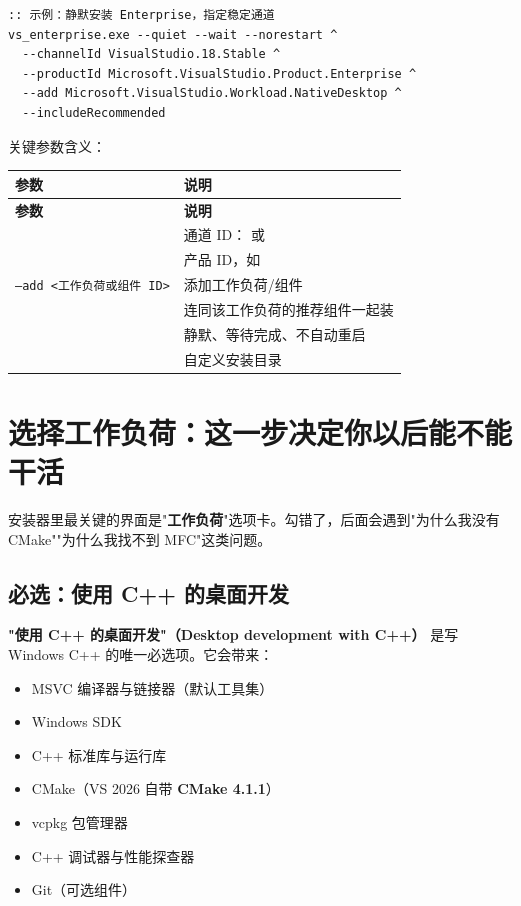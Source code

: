 \begin{lstlisting}[style=shellstyle]
:: 示例：静默安装 Enterprise，指定稳定通道
vs_enterprise.exe --quiet --wait --norestart ^
  --channelId VisualStudio.18.Stable ^
  --productId Microsoft.VisualStudio.Product.Enterprise ^
  --add Microsoft.VisualStudio.Workload.NativeDesktop ^
  --includeRecommended
\end{lstlisting}

关键参数含义：

\begin{longtable}{L{4.6cm}L{10.4cm}}
\toprule
\textbf{参数} & \textbf{说明} \\
\midrule
\endfirsthead
\toprule
\textbf{参数} & \textbf{说明} \\
\midrule
\endhead
\bottomrule
\endlastfoot
{} & 通道 ID： 或  \\
 & 产品 ID，如  \\
\texttt{--add <工作负荷或组件 ID>} & 添加工作负荷/组件 \\
 & 连同该工作负荷的推荐组件一起装 \\
 & 静默、等待完成、不自动重启 \\
 & 自定义安装目录 \\
\end{longtable}

\section{选择工作负荷：这一步决定你以后能不能干活}
安装器里最关键的界面是"\textbf{工作负荷}"选项卡。勾错了，后面会遇到"为什么我没有 CMake""为什么我找不到 MFC"这类问题。

\subsection{必选：使用 C++ 的桌面开发}
\textbf{"使用 C++ 的桌面开发"（Desktop development with C++）} 是写 Windows C++ 的唯一必选项。它会带来：

\begin{itemize}
  \item MSVC 编译器与链接器（默认工具集）
  \item Windows SDK
  \item C++ 标准库与运行库
  \item CMake（VS 2026 自带 \textbf{CMake 4.1.1}）
  \item vcpkg 包管理器
  \item C++ 调试器与性能探查器
  \item Git（可选组件）
\end{itemize}

